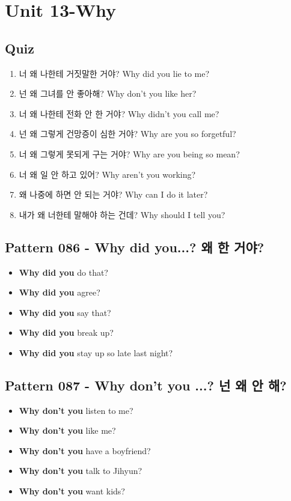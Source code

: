 \documentclass[11pt]{oblivoir}
\begin{document}
\section{Unit 13-Why}
\subsection{Quiz}
\begin{enumerate}
  \color{black} \item 너 왜 나한테 거짓말한 거야?
    \color{light-gray} Why did you lie to me?
  \color{red} \item 넌 왜 그녀를 안 좋아해?
    \color{light-gray} Why don't you like her?
  \color{black} \item 너 왜 나한테 전화 안 한 거야?
    \color{light-gray} Why didn't you call me?
  \color{red} \item 넌 왜 그렇게 건망증이 심한 거야?
    \color{light-gray} Why are you so forgetful?
  \color{red} \item 너 왜 그렇게 못되게 구는 거야?
    \color{light-gray} Why are you being so mean?
  \color{black} \item 너 왜 일 안 하고 있어?
    \color{light-gray} Why aren't you working?
   \color{red} \item 왜 나중에 하면 안 되는 거야?
    \color{light-gray} Why can I do it later?
   \color{black} \item 내가 왜 너한테 말해야 하는 건데?
    \color{light-gray} Why should I tell you?
\end{enumerate}

\subsection{Pattern 086 - Why did you...? 왜 \texttildelow 한 거야?}
\begin{itemize}
  \item \textbf{Why did you} do that?
  \item \textbf{Why did you} agree?
  \item \textbf{Why did you} say that?
  \item \textbf{Why did you} break up?
  \item \textbf{Why did you} stay up so late last night?
\end{itemize}

\subsection{Pattern 087 - Why don't you ...? 넌 왜 \texttildelow 안 해?}
\begin{itemize}
  \item \textbf{Why don't you} listen to me?
  \item \textbf{Why don't you} like me?
  \item \textbf{Why don't you} have a boyfriend?
  \item \textbf{Why don't you} talk to Jihyun?
  \item \textbf{Why don't you} want kids?
\end{itemize}
\end{document}
